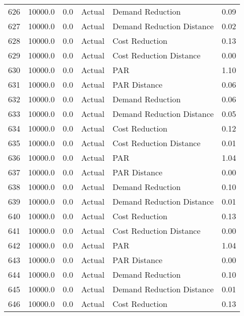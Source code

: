 \begin{longtable}{lrrllr}
626  &      10000.0 &     0.0 &         Actual &           Demand Reduction &   0.09 \\
627  &      10000.0 &     0.0 &         Actual &  Demand Reduction Distance &   0.02 \\
628  &      10000.0 &     0.0 &         Actual &             Cost Reduction &   0.13 \\
629  &      10000.0 &     0.0 &         Actual &    Cost Reduction Distance &   0.00 \\
630  &      10000.0 &     0.0 &         Actual &                        PAR &   1.10 \\
631  &      10000.0 &     0.0 &         Actual &               PAR Distance &   0.06 \\
632  &      10000.0 &     0.0 &         Actual &           Demand Reduction &   0.06 \\
633  &      10000.0 &     0.0 &         Actual &  Demand Reduction Distance &   0.05 \\
634  &      10000.0 &     0.0 &         Actual &             Cost Reduction &   0.12 \\
635  &      10000.0 &     0.0 &         Actual &    Cost Reduction Distance &   0.01 \\
636  &      10000.0 &     0.0 &         Actual &                        PAR &   1.04 \\
637  &      10000.0 &     0.0 &         Actual &               PAR Distance &   0.00 \\
638  &      10000.0 &     0.0 &         Actual &           Demand Reduction &   0.10 \\
639  &      10000.0 &     0.0 &         Actual &  Demand Reduction Distance &   0.01 \\
640  &      10000.0 &     0.0 &         Actual &             Cost Reduction &   0.13 \\
641  &      10000.0 &     0.0 &         Actual &    Cost Reduction Distance &   0.00 \\
642  &      10000.0 &     0.0 &         Actual &                        PAR &   1.04 \\
643  &      10000.0 &     0.0 &         Actual &               PAR Distance &   0.00 \\
644  &      10000.0 &     0.0 &         Actual &           Demand Reduction &   0.10 \\
645  &      10000.0 &     0.0 &         Actual &  Demand Reduction Distance &   0.01 \\
646  &      10000.0 &     0.0 &         Actual &             Cost Reduction &   0.13 \\

\end{longtable}

